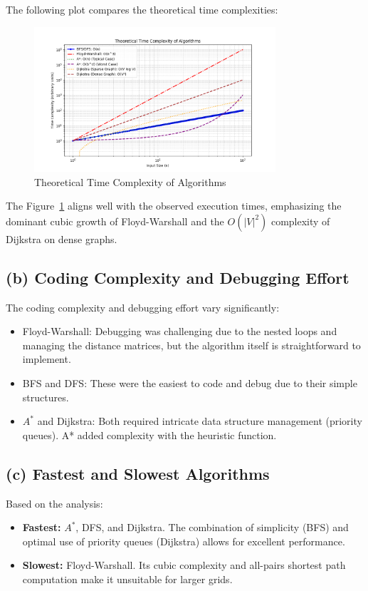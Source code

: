 \documentclass[12pt]{article}
\begin{document}
\noindent The following plot compares the theoretical time complexities:
\begin{figure}[h!]
    \centering
    \includegraphics[width=0.8\textwidth]{theoretical_complexities.png}
    \caption{Theoretical Time Complexity of Algorithms}
    \label{fig:theoretical_complexity}
\end{figure}

\noindent The Figure~\ref{fig:theoretical_complexity} aligns well with the observed execution times, emphasizing the dominant cubic growth of Floyd-Warshall and the \( O(|V|^2) \) complexity of Dijkstra on dense graphs.

\subsection{(b) Coding Complexity and Debugging Effort}
The coding complexity and debugging effort vary significantly:
\begin{itemize}
    \item Floyd-Warshall: Debugging was challenging due to the nested loops and managing the distance matrices, but the algorithm itself is straightforward to implement.
    \item BFS and DFS: These were the easiest to code and debug due to their simple structures.
    \item $A^*$ and Dijkstra: Both required intricate data structure management (priority queues). A* added complexity with the heuristic function.
\end{itemize}

\subsection{(c) Fastest and Slowest Algorithms}
Based on the analysis:
\begin{itemize}
    \item \textbf{Fastest:} $A^*$, DFS, and Dijkstra. The combination of simplicity (BFS) and optimal use of priority queues (Dijkstra) allows for excellent performance.
    \item \textbf{Slowest:} Floyd-Warshall. Its cubic complexity and all-pairs shortest path computation make it unsuitable for larger grids.
\end{itemize}
\end{document}

